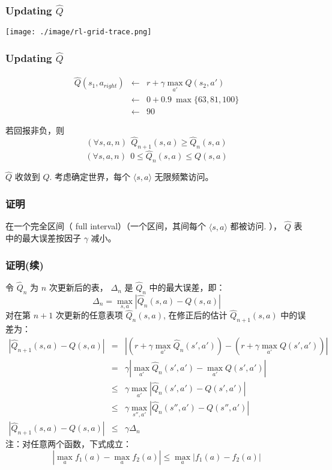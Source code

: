 \documentclass{beamer}
\begin{document}
\begin{frame}
\frametitle{Updating $\hat{Q}$}
\label{sec-3-4}

\texttt{[image: ./image/rl-grid-trace.png]}
\end{frame}
\begin{frame}
\frametitle{Updating $\hat{Q}$}
\label{sec-3-5}

\begin{eqnarray}
\hat{Q}(s_1,a_{right}) & \leftarrow & r + \gamma \max_{a'}\hat{Q}(s_2,a') \nonumber \\
 & \leftarrow & 0 + 0.9 \ \max \{63, 81, 100 \} \nonumber \\ & \leftarrow & 90  \nonumber
\end{eqnarray}

若回报非负，则
\[(\forall s,a,n)\ \ \hat{Q}_{n+1}(s,a) \geq \hat{Q}_{n}(s,a)\]
\[(\forall s,a,n)\ \  0 \leq \hat{Q}_n(s,a) \leq Q(s,a)\]

$\hat{Q}$ 收敛到 $Q$.  考虑确定世界，每个 $\langle s,a \rangle$ 无限频繁访问。
\end{frame}
\begin{frame}
\frametitle{证明}
\label{sec-3-6}

 在一个完全区间（ full interval）（一个区间，其间每个 $\langle s, a \rangle$ 都被访问. ）， $\hat{Q}$ 表中的最大误差按因子 $\gamma$ 减小。
\end{frame}
\begin{frame}
\frametitle{证明(续)}
\label{sec-3-7}

 令 $\hat{Q}_{n}$ 为  $n$ 次更新后的表， $\Delta_{n}$ 是 $\hat{Q}_{n}$ 中的最大误差，即：
\[\Delta_{n} = \max_{s,a} |\hat{Q}_{n}(s,a) - Q(s,a)| \]
 对在第 $n+1$ 次更新的任意表项 $\hat{Q}_{n}(s,a)$, 在修正后的估计 $\hat{Q}_{n+1}(s,a)$ 中的误差为：
    \begin{eqnarray}
    |\hat{Q}_{n+1}(s,a) - Q(s,a)| & = & | (r + \gamma \max_{a'}\hat{Q}_{n}(s',a'))  - (r + \gamma \max_{a'}Q(s',a')) | \nonumber \\
     & = & \gamma | \max_{a'}\hat{Q}_{n}(s',a') - \max_{a'}Q(s',a') | \nonumber\\
     & \leq & \gamma \max_{a'} | \hat{Q}_{n}(s',a') - Q(s',a') | \nonumber \\
     & \leq & \gamma \max_{s'',a'} | \hat{Q}_{n}(s'',a') - Q(s'',a') | \nonumber \\
    |\hat{Q}_{n+1}(s,a) - Q(s,a)| & \leq & \gamma \Delta_{n} \nonumber
    \end{eqnarray}
 注：对任意两个函数，下式成立：
    \[|\max_{a}f_{1}(a) - \max_{a}f_{2}(a)| \leq \max_{a} |f_{1}(a)-f_{2}(a)|\]
\end{frame}
\end{document}
